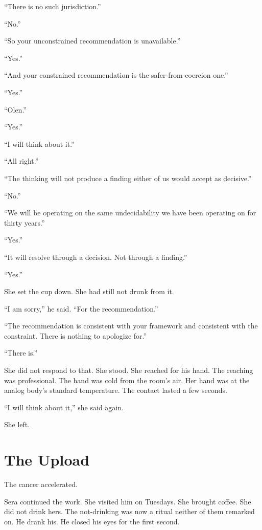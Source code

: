 \enquote{There is no such jurisdiction.}

\enquote{No.}

\enquote{So your unconstrained recommendation is unavailable.}

\enquote{Yes.}

\enquote{And your constrained recommendation is the safer-from-coercion one.}

\enquote{Yes.}

\enquote{Olen.}

\enquote{Yes.}

\enquote{I will think about it.}

\enquote{All right.}

\enquote{The thinking will not produce a finding either of us would accept as decisive.}

\enquote{No.}

\enquote{We will be operating on the same undecidability we have been operating on for thirty years.}

\enquote{Yes.}

\enquote{It will resolve through a decision. Not through a finding.}

\enquote{Yes.}

She set the cup down. She had still not drunk from it.

\enquote{I am sorry,} he said. \enquote{For the recommendation.}

\enquote{The recommendation is consistent with your framework and consistent with the constraint. There is nothing to apologize for.}

\enquote{There is.}

She did not respond to that. She stood. She reached for his hand. The reaching was professional. The hand was cold from the room's air. Her hand was at the analog body's standard temperature. The contact lasted a few seconds.

\enquote{I will think about it,} she said again.

She left.

\chapter{The Upload}

\noindent The cancer accelerated.

Sera continued the work. She visited him on Tuesdays. She brought coffee. She did not drink hers. The not-drinking was now a ritual neither of them remarked on. He drank his. He closed his eyes for the first second.

